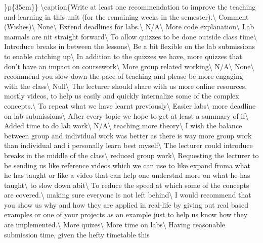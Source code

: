 \documentclass[
]{article}
\begin{document}
\arraybackslash\}p\{35em\}\}
\textbackslash caption\{\label{tab:RawWishesData}Write at least one
recommendation to improve the teaching and learning in this unit (for
the remaining weeks in the semester).\textbackslash{} \toprule Comment
(Wishes)\textbackslash{} \midrule None\textbackslash{} \hline Extend
deadlines for labs.\textbackslash{} \hline N/A\textbackslash{} \hline
More code explanation\textbackslash{} \hline Lab manuals are nit
straight forward\textbackslash{} \hline To allow quizzes to be done
outside class time\textbackslash{} \hline Introduce breaks in between
the lessons\textbackslash{} \hline Be a bit flexible on the lab
submissions to enable catching up\textbackslash{} \hline In addition to
the quizzes we have, more quizzes that don't have an impact on
coursework\textbackslash{} \hline More group related
working\textbackslash{} \hline N/A\textbackslash{} \hline
None\textbackslash{} \hline recommend you slow down the pace of teaching
and please be more engaging with the class\textbackslash{} \hline
Null\textbackslash{} \hline The lecturer should share with us more
online resources, mostly videos, to help us easily and quickly
internalize some of the complex concepts.\textbackslash{} \hline To
repeat what we have learnt previously\textbackslash{} \hline Easier
labs\textbackslash{} \hline more deadline on lab
submissions\textbackslash{} \hline After every topic we hope to get at
least a summary of if\textbackslash{} \hline Added time to do lab
work\textbackslash{} \hline N/A\textbackslash{} \hline teaching more
theory\textbackslash{} \hline I wish the balance between group and
individual work was better as there is way more group work than
individual and i personally learn best myself\textbackslash{} \hline The
lecturer could introduce breaks in the middle of the
class\textbackslash{} \hline reduced group work\textbackslash{} \hline
Requesting the lecturer to be sending us like reference videos which we
can use to like expand froma what he has taught or like a video that can
help one understnd more on what he has taught\textbackslash{} \hline to
slow down abit\textbackslash{} \hline To reduce the speed at which some
of the concepts are covered.\textbackslash{} \hline making sure everyone
is not left behind\textbackslash{} \hline I would recommend that you
show us why and how they are applied in real-life by giving out real
based examples or one of your projects as an example just to help us
know how they are implemented.\textbackslash{} \hline More
quizes\textbackslash{} \hline More time on labs\textbackslash{} \hline
Having reasonable submission time, given the hefty timetable this
\end{document}
